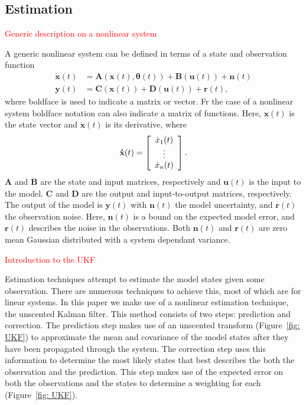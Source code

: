\documentclass{article}%
\newcommand\red{\textcolor{red}}
\begin{document}
\subsection{Estimation}

\red{Generic description on a nonlinear system}

A generic nonlinear system can be defined in terms of a state and observation function \begin{align}
\label{eqn: NonlinEstS}
\mathbf{\dot{x}}(t) &= \mathbf{A}(\mathbf{x}(t),\mathbf{\theta}(t)) + \mathbf{B}(\mathbf{u}(t)) + \mathbf{n}(t)\\
\label{eqn: NonlinEstO}
\mathbf{y}(t)  &= \mathbf{C}(\mathbf{x}(t)) +\mathbf{D}(\mathbf{u}(t))+\mathbf{r}(t),
\end{align} where boldface is used to indicate a matrix or vector. Fr the case of a nonlinear system boldface notation can also indicate a matrix of functions. Here, $\mathbf{x}(t)$ is the state vector and $\dot{\mathbf{x}}(t)$ is its derivative, where
\[ \mathbf{\dot{x}}(t) = \left[ \begin{array}[pos]{c}
\dot{x}_{1}(t)\\
\vdots \\
\dot{x}_{n}(t) \end{array} \right] .\] $\mathbf{A}$ and $\mathbf{B}$ are the state and input matrices, respectively and $\mathbf{u}(t)$ is the input to the model. $\mathbf{C}$ and $\mathbf{D}$ are the output and input-to-output matrices, respectively. The output of the model is $\mathbf{y}(t)$ with $\mathbf{n}(t)$ the model uncertainty, and $\mathbf{r}(t)$ the observation noise. Here, $\mathbf{n}(t)$ is a bound on the expected model error, and $\mathbf{r}(t)$ describes the noise in the observations. Both $\mathbf{n}(t)$ and $\mathbf{r}(t)$ are zero mean Gaussian distributed with a system dependant variance. 


\red{Introduction to the UKF}

Estimation techniques attempt to estimate the model states given some observation. There are numerous techniques to achieve this, most of which are for linear systems. In this paper we make use of a nonlinear estimation technique, the unscented Kalman filter. This method consists of two steps: prediction and correction. The prediction step makes use of an unscented transform (Figure~\ref{fig: UKF}) to approximate the mean and covariance of the model states after they have been propagated through the system. The correction step uses this information to determine the most likely states that best describes the both the observation and the prediction. This step makes use of the expected error on both the observations and the states to determine a weighting for each (Figure~\ref{fig: UKF}).
\end{document}
